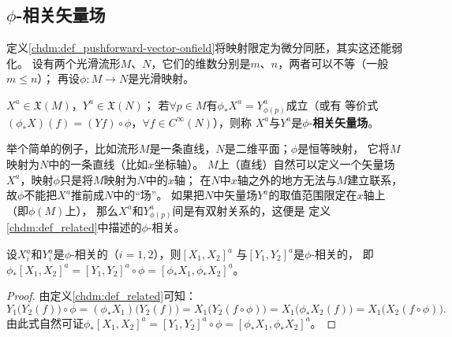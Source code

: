 \subsection{$\phi$-相关矢量场}\label{chdm:sec_related}
定义\ref{chdm:def_pushforward-vector-onfield}将映射限定为微分同胚，其实这还能弱化。
设有两个光滑流形$M$、$N$，它们的维数分别是$m$、$n$，两者可以不等（一般$m\leqslant n$）；
再设$\phi:M\to N$是光滑映射。 %
\begin{definition}\label{chdm:def_related}
    $X^a\in \mathfrak{X}(M)$，$Y^a\in \mathfrak{X}(N)$；
    若$\forall p\in M$有$\phi_{*} X^a = Y^a_{\phi(p)}$成立（或有
    等价式$(\phi_{*}X)(f)= (Yf)\circ\phi$，$\forall f\in C^\infty(N)$），则称
    $X^a$与$Y^a$是$\phi$-\textbf{相关矢量场}。
\end{definition}
举个简单的例子，比如流形$M$是一条直线，$N$是二维平面；$\phi$是恒等映射，
它将$M$映射为$N$中的一条直线（比如$x$坐标轴）。
$M$上（直线）自然可以定义一个矢量场$X^a$，映射$\phi$只是将$M$映射为$N$中的$x$轴；
在$N$中$x$轴之外的地方无法与$M$建立联系，故$\phi$不能把$X^a$推前成$N$中的“场”。
如果把$N$中矢量场$Y^a$的取值范围限定在$x$轴上（即$\phi(M)$上），
那么$X^a$和$Y^a_{\phi(p)}$间是有双射关系的，这便是
定义\ref{chdm:def_related}中描述的$\phi$-相关。


\begin{theorem}\label{chdm:thm_push-Poisson-related}
    设$X_i^a$和$Y_i^a$是$\phi$-相关的（$i=1,2$），则$[X_1,X_2]^a$
    与$[Y_1,Y_2]^a$是$\phi$-相关的，
    即$\phi_{*} [X_1,X_2]^a = [Y_1,Y_2]^a\circ \phi =\left[\phi_{*}X_1,\phi_{*}X_2\right]^a$。
\end{theorem}
\begin{proof}
    由定义\ref{chdm:def_related}可知：
    \begin{equation*}
        Y_1\bigl( Y_2 (f)\bigr)\circ \phi = (\phi_* X_1 )\bigl( Y_2 (f)\bigr)
        =X_1\bigl( Y_2 (f\circ \phi)\bigr)  =X_1\bigl( \phi_{*} X_2 (f)\bigr) = X_1\bigl( X_2 (f\circ \phi)\bigr) .
    \end{equation*}
    由此式自然可证$\phi_{*} [X_1,X_2]^a = [Y_1,Y_2]^a\circ \phi =\left[\phi_{*}X_1,\phi_{*}X_2\right]^a$。
\end{proof}

